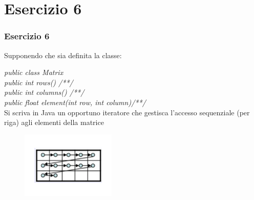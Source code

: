 \documentclass{beamer}
\begin{document}
\section{Esercizio 6}
\begin{frame}
\frametitle{Esercizio 6}
Supponendo che sia definita la classe:

\emph{public class Matrix {\\
	public int rows(){ /**/ }\\
	public int columns(){  /**/ }\\
	public float element(int row, int column){/**/}\\
}}
Si scriva in Java un opportuno iteratore che gestisca l’accesso sequenziale (per riga) agli elementi della matrice
\begin{figure}[h]
\includegraphics[width=0.4\textwidth]{Img/Matrix.pdf}
\end{figure}
\end{frame}





\end{document}
